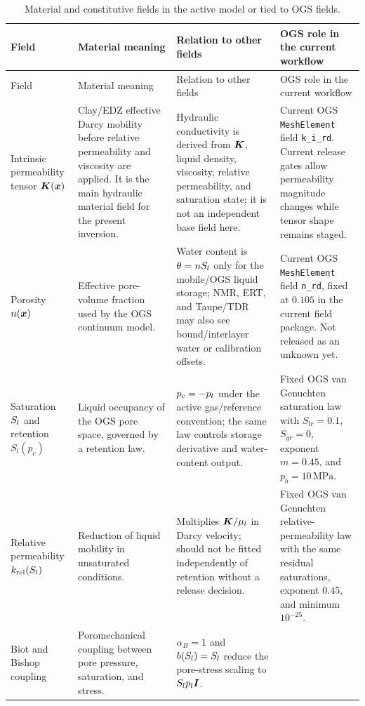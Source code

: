 \begingroup
\small
\setlength{\tabcolsep}{3pt}
\begin{longtable}{@{}L{0.17\textwidth} L{0.27\textwidth} L{0.24\textwidth} L{0.22\textwidth}@{}}
\caption{Material and constitutive fields in the active model or tied to OGS fields.}
\label{tab:material-fields}\\
\toprule
Field & Material meaning & Relation to other fields & OGS role in the current workflow\\
\midrule
\endfirsthead
\toprule
Field & Material meaning & Relation to other fields & OGS role in the current workflow\\
\midrule
\endhead
\bottomrule
\endlastfoot
Intrinsic permeability tensor \(\bm{K}(\bm{x})\) &
Clay/EDZ effective Darcy mobility before relative permeability and viscosity are
applied.  It is the main hydraulic material field for the present inversion. &
Hydraulic conductivity is derived from \(\bm{K}\), liquid density, viscosity, relative
permeability, and saturation state; it is not an independent base field here. &
Current OGS \texttt{MeshElement} field \texttt{k\_i\_rd}.  Current release gates allow
permeability magnitude changes while tensor shape remains staged.\\
Porosity \(n(\bm{x})\) &
Effective pore-volume fraction used by the OGS continuum model. &
Water content is \(\theta=nS_l\) only for the mobile/OGS liquid storage; NMR,
ERT, and Taupe/TDR may also see bound/interlayer water or calibration offsets. &
Current OGS \texttt{MeshElement} field \texttt{n\_rd}, fixed at \(0.105\) in the
current field package.  Not released as an unknown yet.\\
Saturation \(S_l\) and retention \(S_l(p_c)\) &
Liquid occupancy of the OGS pore space, governed by a retention law. &
\(p_c=-p_l\) under the active gas/reference convention; the same law controls
storage derivative and water-content output. &
Fixed OGS van Genuchten saturation law with \(S_{lr}=0.1\), \(S_{gr}=0\),
exponent \(m=0.45\), and \(p_b=10\,\mathrm{MPa}\).\\
Relative permeability \(k_{\mathrm{rel}}(S_l)\) &
Reduction of liquid mobility in unsaturated conditions. &
Multiplies \(\bm{K}/\mu_l\) in Darcy velocity; should not be fitted independently of
retention without a release decision. &
Fixed OGS van Genuchten relative-permeability law with the same residual
saturations, exponent \(0.45\), and minimum \(10^{-25}\).\\
Biot and Bishop coupling &
Poromechanical coupling between pore pressure, saturation, and stress. &
\(\alpha_B=1\) and \(b(S_l)=S_l\) reduce the pore-stress scaling to \(S_lp_l\bm{I}\). &

\end{longtable}
